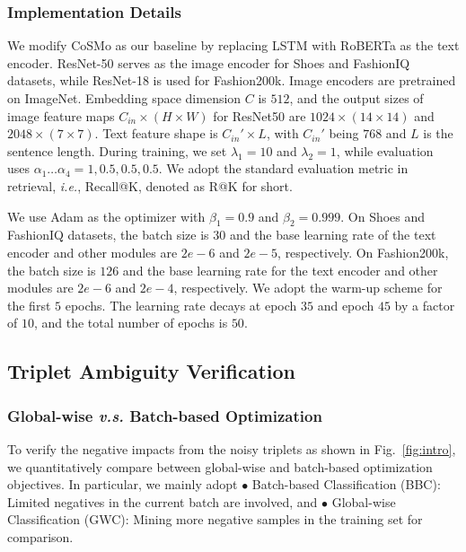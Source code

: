 \documentclass[sigconf]{acmart}
\def\ie{\emph{i.e.}}
\begin{document}
\subsubsection{Implementation Details} 

We modify CoSMo \cite{lee2021cosmo} as our baseline by replacing LSTM \cite{graves2012long} with RoBERTa \cite{liu2019RoBERTa} as the text encoder. ResNet-50 \cite{he2016deep} serves as the image encoder for Shoes and FashionIQ datasets, while ResNet-18 \cite{he2016deep} is used for Fashion200k. Image encoders are pretrained on ImageNet. Embedding space dimension $C$ is $512$, and the output sizes of image feature maps $C_{in} \times (H \times W)$ for ResNet50 are $1024 \times (14 \times 14)$ and $2048 \times (7 \times 7)$. Text feature shape is $C_{in}' \times L$, with $C_{in}'$ being $768$ and $L$ is the sentence length. During training, we set $\lambda_1 = 10$ and $\lambda_2 = 1$, while evaluation uses $\alpha_{1} \dots \alpha_4 = 1, 0.5, 0.5, 0.5$. We adopt the standard evaluation metric in retrieval, \ie, Recall@K, denoted as R@K for short.

We use Adam \cite{kingma2014adam} as the optimizer with $\beta_1 = 0.9$ and $\beta_2 = 0.999$. On Shoes and FashionIQ datasets, the batch size is $30$ and the base learning rate of the text encoder and other modules are $2e-6$ and $2e-5$, respectively. On Fashion200k, the batch size is $126$ and the base learning rate for the text encoder and other modules are $2e-6$ and $2e-4$, respectively. We adopt the warm-up scheme for the first $5$ epochs. The learning rate decays at epoch $35$ and epoch $45$ by a factor of $10$, and the total number of epochs is $50$. 

\subsection{Triplet Ambiguity Verification}
\label{subsec:ambiguity}

\subsubsection{Global-wise \emph{v.s.} Batch-based Optimization}

To verify the negative impacts from the noisy triplets as shown in Fig.~\ref{fig:intro}, we quantitatively compare between global-wise and batch-based optimization objectives. In particular, we mainly adopt $\bullet$ Batch-based Classification (BBC): Limited negatives in the current batch are involved, and $\bullet$ Global-wise Classification (GWC): Mining more negative samples in the training set for comparison.
\end{document}

